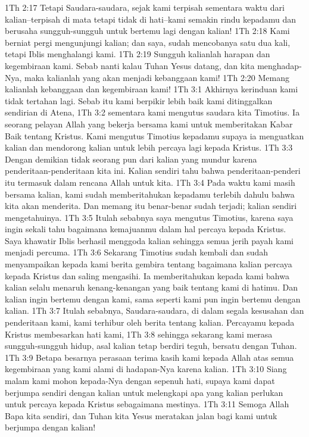 1Th 2:17  Tetapi Saudara-saudara, sejak kami terpisah sementara waktu dari kalian--terpisah di mata tetapi tidak di hati--kami semakin rindu kepadamu dan berusaha sungguh-sungguh untuk bertemu lagi dengan kalian!
1Th 2:18  Kami berniat pergi mengunjungi kalian; dan saya, sudah mencobanya satu dua kali, tetapi Iblis menghalangi kami.
1Th 2:19  Sungguh kalianlah harapan dan kegembiraan kami. Sebab nanti kalau Tuhan Yesus datang, dan kita menghadap-Nya, maka kalianlah yang akan menjadi kebanggaan kami!
1Th 2:20  Memang kalianlah kebanggaan dan kegembiraan kami!
1Th 3:1  Akhirnya kerinduan kami tidak tertahan lagi. Sebab itu kami berpikir lebih baik kami ditinggalkan sendirian di Atena,
1Th 3:2  sementara kami mengutus saudara kita Timotius. Ia seorang pelayan Allah yang bekerja bersama kami untuk memberitakan Kabar Baik tentang Kristus. Kami mengutus Timotius kepadamu supaya ia menguatkan kalian dan mendorong kalian untuk lebih percaya lagi kepada Kristus.
1Th 3:3  Dengan demikian tidak seorang pun dari kalian yang mundur karena penderitaan-penderitaan kita ini. Kalian sendiri tahu bahwa penderitaan-penderi itu termasuk dalam rencana Allah untuk kita.
1Th 3:4  Pada waktu kami masih bersama kalian, kami sudah memberitahukan kepadamu terlebih dahulu bahwa kita akan menderita. Dan memang itu benar-benar sudah terjadi; kalian sendiri mengetahuinya.
1Th 3:5  Itulah sebabnya saya mengutus Timotius, karena saya ingin sekali tahu bagaimana kemajuanmu dalam hal percaya kepada Kristus. Saya khawatir Iblis berhasil menggoda kalian sehingga semua jerih payah kami menjadi percuma.
1Th 3:6  Sekarang Timotius sudah kembali dan sudah menyampaikan kepada kami berita gembira tentang bagaimana kalian percaya kepada Kristus dan saling mengasihi. Ia memberitahukan kepada kami bahwa kalian selalu menaruh kenang-kenangan yang baik tentang kami di hatimu. Dan kalian ingin bertemu dengan kami, sama seperti kami pun ingin bertemu dengan kalian.
1Th 3:7  Itulah sebabnya, Saudara-saudara, di dalam segala kesusahan dan penderitaan kami, kami terhibur oleh berita tentang kalian. Percayamu kepada Kristus membesarkan hati kami,
1Th 3:8  sehingga sekarang kami merasa sungguh-sungguh hidup, asal kalian tetap berdiri teguh, bersatu dengan Tuhan.
1Th 3:9  Betapa besarnya perasaan terima kasih kami kepada Allah atas semua kegembiraan yang kami alami di hadapan-Nya karena kalian.
1Th 3:10  Siang malam kami mohon kepada-Nya dengan sepenuh hati, supaya kami dapat berjumpa sendiri dengan kalian untuk melengkapi apa yang kalian perlukan untuk percaya kepada Kristus sebagaimana mestinya.
1Th 3:11  Semoga Allah Bapa kita sendiri, dan Tuhan kita Yesus meratakan jalan bagi kami untuk berjumpa dengan kalian!
